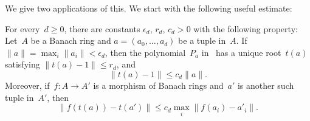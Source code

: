 \documentclass[11pt,a4paper]{amsart}
\newcommand{\cref}[1]{\zcref{#1}}
\numberwithin{equation}{section}
\theoremstyle{plain}
\theoremstyle{definition}
\theoremstyle{remark}
\begin{document}
We give two applications of this.
We start with the following useful estimate:

\begin{lemma}\label{hensel}
  For every~\(d\geq0\), there are constants
  \(\epsilon_{d}\), \(r_{d}\), \(c_{d}>0\) with the following property:
  Let~\(A\) be a Banach ring
  and \(a=(a_{0},\dotsc,a_{d})\) be a tuple in~\(A\).
  If \(\lVert a\rVert=\max_i\lVert a_i\rVert<\epsilon_d\), then
  the polynomial~\(P_a\) in~\cref{e:hensel} has a unique root~\(t(a)\) satisfying
  \(\lVert t(a)-1\rVert\leq r_d\), and
  \begin{equation}\label{e:hensel-bound}
    \lVert t(a)-1\rVert\leq c_d\lVert a\rVert.
  \end{equation}
  Moreover, if~\(f\colon A\to A'\) is a morphism of Banach rings
  and~\(a'\) is another such tuple in~\(A'\),
  then
  \begin{equation}\label{e:hensel-diff}
    \lVert f(t(a))-t(a')\rVert
    \leq c_d\max_i\lVert f(a_i)-a'_i\rVert.
  \end{equation}
\end{lemma}
\end{document}
